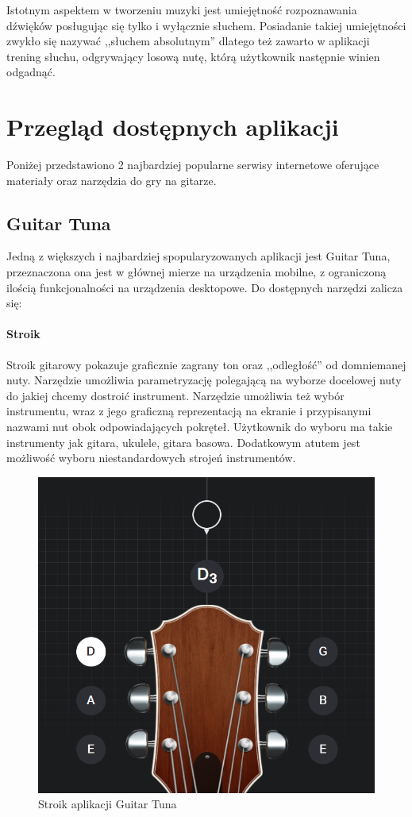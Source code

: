 Istotnym aspektem w tworzeniu muzyki jest umiejętność rozpoznawania dźwięków posługując się tylko i wyłącznie słuchem. Posiadanie takiej umiejętności zwykło się nazywać ,,słuchem absolutnym'' dlatego też zawarto w aplikacji trening słuchu, odgrywający losową nutę, którą użytkownik następnie winien odgadnąć.  

\section{Przegląd dostępnych aplikacji}
Poniżej przedstawiono 2 najbardziej popularne serwisy internetowe oferujące materiały oraz narzędzia do gry na gitarze. 

\subsection{Guitar Tuna}

Jedną z większych i najbardziej spopularyzowanych aplikacji jest Guitar Tuna, przeznaczona ona jest w głównej mierze na urządzenia mobilne, z ograniczoną ilością funkcjonalności na urządzenia desktopowe. Do dostępnych narzędzi zalicza się:

\paragraph{Stroik}


Stroik gitarowy pokazuje graficznie zagrany ton oraz ,,odległość'' od domniemanej nuty. Narzędzie umożliwia parametryzację polegającą na wyborze docelowej nuty do jakiej chcemy dostroić instrument. Narzędzie umożliwia też wybór instrumentu, wraz z jego graficzną reprezentacją na ekranie i przypisanymi nazwami nut obok odpowiadających pokręteł. Użytkownik do wyboru ma takie instrumenty jak gitara, ukulele, gitara basowa. Dodatkowym atutem jest możliwość wyboru niestandardowych strojeń instrumentów. 

\begin{figure}[htb]
	\centering
	\includegraphics[width=.4\linewidth]{rys02/GTSTROIK}
	\caption{Stroik aplikacji Guitar Tuna} \label{fig:pageLayout}
\end{figure}

